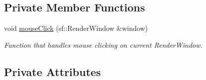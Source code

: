 \subsection*{Private Member Functions}
\begin{DoxyCompactItemize}
\item 
void \hyperlink{classMenu__State_aedafbb9cdbe7ea73ff6b071f2efbbcc7}{mouse\+Click} (sf\+::\+Render\+Window \&window)
\begin{DoxyCompactList}\small\item\em Function that handles mouse clicking on current Render\+Window. \end{DoxyCompactList}\end{DoxyCompactItemize}
\subsection*{Private Attributes}

